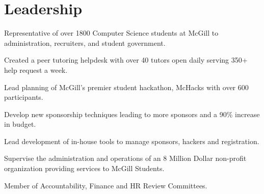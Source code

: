 \documentclass[]{deedy-resume-openfont}
\begin{document}
\begin{minipage}[t]{0.66\textwidth}

\section{Leadership}
\begin{tightemize}
\item Representative of over 1800 Computer Science students at McGill to administration, recruiters, and student government. 
\item Created a peer tutoring helpdesk with over 40 tutors open daily serving 350+ help request a week.
\end{tightemize}
\sectionsep

\begin{tightemize}
\item Lead planning of McGill's premier student hackathon, McHacks with over 600 participants.
\item Develop new sponsorship techniques leading to more sponsors and a 90\% increase in budget.
\item Lead development of in-house tools to manage sponsors, hackers and registration.
\end{tightemize}
\sectionsep

\begin{tightemize}
\item Supervise the administration and operations of an 8 Million Dollar non-profit organization providing services to McGill Students. 
\item Member of Accountability, Finance and HR Review Committees. 
\end{tightemize}
\sectionsep




\end{minipage}
\end{document}
